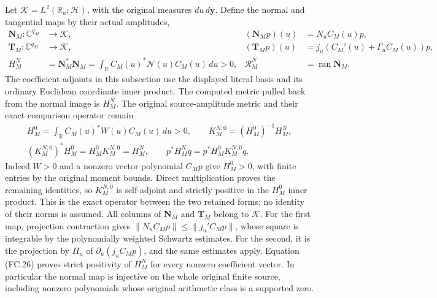 Let \(\mathscr K=L^2(\mathbb R_u;\mathscr H)\), with the
original measures \(du\,d\mathbf y\). Define the normal and
tangential maps by their actual amplitudes,
\[
 \begin{aligned}
 \mathbf N_M:\mathbb C^{q_M}&\longrightarrow\mathscr K,
       & (\mathbf N_Mp)(u)&=N_uC_M(u)p,\\
 \mathbf T_M:\mathbb C^{q_M}&\longrightarrow\mathscr K,
       & (\mathbf T_Mp)(u)&=j_u(C_M'(u)+\Gamma_uC_M(u))p,\\
 H_M^N&=\mathbf N_M^*\mathbf N_M
       =\int_{\mathbb R}C_M(u)^*\mathcal N(u)C_M(u)\,du>0,
       &\mathscr R_M^N&=\operatorname{ran}\mathbf N_M.
 \end{aligned}
 \tag{FC.29}
\]
The coefficient adjoints in this subsection use the displayed literal
basis and its ordinary Euclidean coordinate inner product. The computed
metric pulled back from the normal image is \(H_M^N\). The original
source-amplitude metric and their exact comparison operator remain
\[
 \begin{gathered}
 H_M^0=\int_{\mathbb R}C_M(u)^*W(u)C_M(u)\,du>0,\qquad
 K_M^{N:0}=(H_M^0)^{-1}H_M^N,\\
 (K_M^{N:0})^*H_M^0=H_M^0K_M^{N:0}=H_M^N,\qquad
 p^*H_M^Nq=p^*H_M^0K_M^{N:0}q.
 \end{gathered}
 \tag{FC.29a}
\]
Indeed \(W>0\) and a nonzero vector polynomial \(C_Mp\)
give \(H_M^0>0\), with finite entries by the original moment
bounds. Direct multiplication proves the remaining identities, so
\(K_M^{N:0}\) is self-adjoint and strictly positive in the
\(H_M^0\) inner product. This is the exact operator between
the two retained forms; no identity of their norms is assumed.
All columns of \(\mathbf N_M\) and \(\mathbf T_M\)
belong to \(\mathscr K\). For the first map, projection contraction
gives \(\|N_uC_Mp\|\le\|j_u'C_Mp\|\), whose square is
integrable by the polynomially weighted Schwartz estimates.
For the second, it is the projection by \(\Pi_u\) of
\(\partial_u(j_uC_Mp)\), and the same estimates apply.
Equation (FC.26) proves strict positivity of \(H_M^N\) for every
nonzero coefficient vector. In particular the normal map is injective
on the whole original finite source, including nonzero polynomials
whose original arithmetic class is a supported zero.

